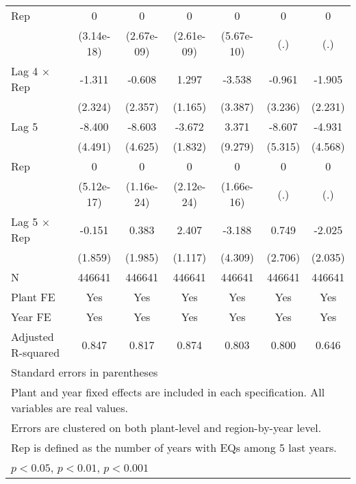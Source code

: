 \begin{table}[htbp]
\begin{tabular}{l*{6}{c}}
\addlinespace
Rep             &        0         &        0         &        0         &        0         &        0         &        0         \\
                &(3.14e-18)         &(2.67e-09)         &(2.61e-09)         &(5.67e-10)         &      (.)         &      (.)         \\
\addlinespace
Lag 4 $\times$ Rep&   -1.311         &   -0.608         &    1.297         &   -3.538         &   -0.961         &   -1.905         \\
                &  (2.324)         &  (2.357)         &  (1.165)         &  (3.387)         &  (3.236)         &  (2.231)         \\
\addlinespace
Lag 5           &   -8.400         &   -8.603         &   -3.672\sym{*}  &    3.371         &   -8.607         &   -4.931         \\
                &  (4.491)         &  (4.625)         &  (1.832)         &  (9.279)         &  (5.315)         &  (4.568)         \\
\addlinespace
Rep             &        0         &        0         &        0         &        0         &        0         &        0         \\
                &(5.12e-17)         &(1.16e-24)         &(2.12e-24)         &(1.66e-16)         &      (.)         &      (.)         \\
\addlinespace
Lag 5 $\times$ Rep&   -0.151         &    0.383         &    2.407\sym{*}  &   -3.188         &    0.749         &   -2.025         \\
                &  (1.859)         &  (1.985)         &  (1.117)         &  (4.309)         &  (2.706)         &  (2.035)         \\
\midrule
N               &   446641         &   446641         &   446641         &   446641         &   446641         &   446641         \\
Plant FE        &      Yes         &      Yes         &      Yes         &      Yes         &      Yes         &      Yes         \\
Year FE         &      Yes         &      Yes         &      Yes         &      Yes         &      Yes         &      Yes         \\
Adjusted R-squared&    0.847         &    0.817         &    0.874         &    0.803         &    0.800         &    0.646         \\
\bottomrule
\multicolumn{7}{l}{\footnotesize Standard errors in parentheses}\\
\multicolumn{7}{l}{\footnotesize Plant and year fixed effects are included in each specification. All variables are real values.}\\
\multicolumn{7}{l}{\footnotesize Errors are clustered on both plant-level and region-by-year level.}\\
\multicolumn{7}{l}{\footnotesize Rep is defined as the number of years with EQs among 5 last years.}\\
\multicolumn{7}{l}{\footnotesize \sym{*} \(p<0.05\), \sym{**} \(p<0.01\), \sym{***} \(p<0.001\)}\\
\end{tabular}
\end{table}
